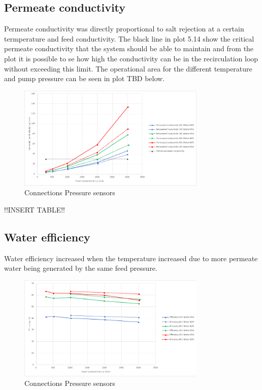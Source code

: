 \subsection{Permeate conductivity}

Permeate conductivity was directly proportional to salt rejection at a certain termperature and feed conductivity. The black line in plot 5.14 show the critical permeate conductivity that the system should be able to maintain and from the plot it is possible to se how high the conductivity can be in the recirculation loop without exceeding this limit. The operational area for the different temperature and pump pressure can be seen in plot TBD below.

\begin{figure}[H]
    \centering
    \includegraphics[width=0.8\textwidth]{PermCond}
    \caption{Connections Pressure sensors}
    \label{fig:PressConn}
\end{figure}

!!INSERT TABLE!!

\subsection{Water efficiency}

Water efficiency increased when the temperature increased due to more permeate water being generated by the same feed pressure.

\begin{figure}[H]
    \centering
    \includegraphics[width=0.8\textwidth]{Efficiency}
    \caption{Connections Pressure sensors}
    \label{fig:PressConn}
\end{figure}

